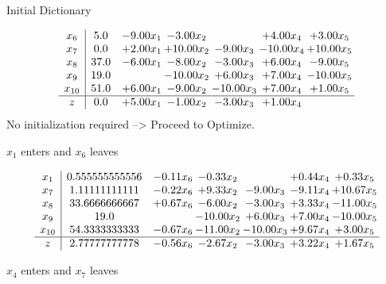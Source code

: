 \documentclass[8pt]{article}
\begin{document}
Initial Dictionary 

\[\begin{array}{c| c c@{\hskip 2pt} c@{\hskip 2pt} c@{\hskip 2pt} c@{\hskip 2pt} c@{\hskip 2pt} }
 x_{6}   &  5.0 & -9.00 x_{1} & -3.00 x_{2} &   & +  4.00 x_{4} & +  3.00 x_{5}\\
 x_{7}   &  0.0 & +  2.00 x_{1} & + 10.00 x_{2} & -9.00 x_{3} & -10.00 x_{4} & + 10.00 x_{5}\\
 x_{8}   &  37.0 & -6.00 x_{1} & -8.00 x_{2} & -3.00 x_{3} & +  6.00 x_{4} & -9.00 x_{5}\\
 x_{9}   &  19.0  &   & -10.00 x_{2} & +  6.00 x_{3} & +  7.00 x_{4} & -10.00 x_{5}\\
 x_{10}   &  51.0 & +  6.00 x_{1} & -9.00 x_{2} & -10.00 x_{3} & +  7.00 x_{4} & +  1.00 x_{5}\\
\hline
z    &  0.0 & +  5.00 x_{1} & -1.00 x_{2} & -3.00 x_{3} & +  1.00 x_{4} &   \\
\end{array}\]
No initialization required --> Proceed to Optimize. 


 $ x_{1} $ enters and $ x_{6} $ leaves 

 \[\begin{array}{c| c c@{\hskip 2pt} c@{\hskip 2pt} c@{\hskip 2pt} c@{\hskip 2pt} c@{\hskip 2pt} }
 x_{1}   &  0.555555555556 & -0.11 x_{6} & -0.33 x_{2} &   & +  0.44 x_{4} & +  0.33 x_{5}\\
 x_{7}   &  1.11111111111 & -0.22 x_{6} & +  9.33 x_{2} & -9.00 x_{3} & -9.11 x_{4} & + 10.67 x_{5}\\
 x_{8}   &  33.6666666667 & +  0.67 x_{6} & -6.00 x_{2} & -3.00 x_{3} & +  3.33 x_{4} & -11.00 x_{5}\\
 x_{9}   &  19.0  &   & -10.00 x_{2} & +  6.00 x_{3} & +  7.00 x_{4} & -10.00 x_{5}\\
 x_{10}   &  54.3333333333 & -0.67 x_{6} & -11.00 x_{2} & -10.00 x_{3} & +  9.67 x_{4} & +  3.00 x_{5}\\
\hline
z    &  2.77777777778 & -0.56 x_{6} & -2.67 x_{2} & -3.00 x_{3} & +  3.22 x_{4} & +  1.67 x_{5}\\
\end{array}\]


 $ x_{4} $ enters and $ x_{7} $ leaves 
\end{document}
